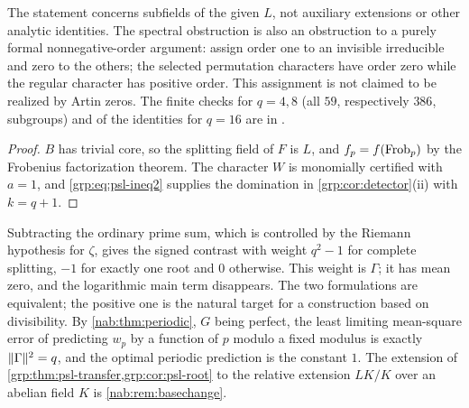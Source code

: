 The statement concerns subfields of the given $L$, not auxiliary extensions or
other analytic identities. The spectral obstruction is also an obstruction to
a purely formal nonnegative-order argument: assign order one to an invisible
irreducible and zero to the others; the selected permutation characters have
order zero while the regular character has positive order. This assignment is
not claimed to be realized by Artin zeros. The finite checks for $q=4,8$ (all
$59$, respectively $386$, subgroups) and of the identities for $q=16$ are in
.


\begin{proof}
$B$ has trivial core, so the splitting field of $F$ is $L$, and
$f_p=f(\operatorname{Frob}_p)$ by the Frobenius factorization theorem. The character $W$ is
monomially certified with $a=1$, and \eqref{grp:eq:psl-ineq2} supplies the
domination in \cref{grp:cor:detector}(ii) with $k=q+1$.
\end{proof}

Subtracting the ordinary prime sum, which is controlled by the Riemann
hypothesis for $\zeta$, gives the signed contrast with weight $q^2-1$ for
complete splitting, $-1$ for exactly one root and $0$ otherwise. This weight
is $\Gamma$; it has mean zero, and the logarithmic main term disappears. The
two formulations are equivalent; the positive one is the natural target for a
construction based on divisibility. By \cref{nab:thm:periodic}, $G$ being perfect, the
least limiting mean-square error of predicting $w_p$ by a function of $p$ modulo a fixed
modulus is exactly $\lVert\Gamma\rVert^2=q$, and the optimal periodic prediction is the
constant $1$. The extension of \cref{grp:thm:psl-transfer,grp:cor:psl-root} to the
relative extension $LK/K$ over an abelian field $K$ is \cref{nab:rem:basechange}.

